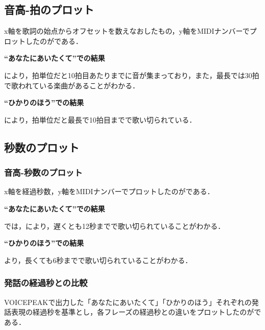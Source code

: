\subsection{音高-拍のプロット}\label{sec:4.1}

x軸を歌詞の始点からオフセットを数えなおしたもの，y軸をMIDIナンバーでプロットしたのがである．\par
\textbf{“あなたにあいたくて”での結果}\par
{}により，拍単位だと10拍目あたりまでに音が集まっており，また，最長では30拍で歌われている楽曲があることがわかる．\par
\textbf{“ひかりのほう”での結果}\par
{}により，拍単位だと最長で10拍目までで歌い切られている．\par


\subsection{秒数のプロット}
\subsubsection{音高-秒数のプロット}\label{4.2.1}
x軸を経過秒数，y軸をMIDIナンバーでプロットしたのがである．\par

\textbf{“あなたにあいたくて”での結果}\par
{}では，により，遅くとも12秒までで歌い切られていることがわかる．\par

\textbf{“ひかりのほう”での結果}\par
{}より，長くても6秒までで歌い切られていることがわかる．
\subsubsection{発話の経過秒との比較}
VOICEPEAKで出力した「あなたにあいたくて」「ひかりのほう」それぞれの発話表現の経過秒を基準とし，各フレーズの経過秒との違いをプロットしたのがである．



